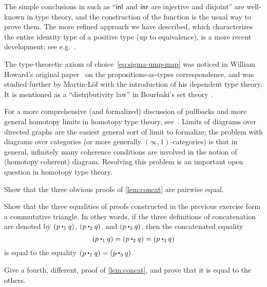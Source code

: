 The simple conclusions in  such as ``${\mathsf{inl}}$ and ${\mathsf{inr}}$ are injective and disjoint'' are well-known in type theory, and the construction of the function \encode is the usual way to prove them.
The more refined approach we have described, which characterizes the entire identity type of a positive type (up to equivalence), is a more recent development; see e.g.~\cite{ls:pi1s1}.

%
The type-theoretic axiom of choice~\eqref{eq:sigma-ump-map} was noticed in William Howard's original paper~\cite{howard:pat} on the propositions-as-types correspondence, and was studied further by Martin-L\"of with the introduction of his dependent type theory.  It is mentioned as a ``distributivity law'' in Bourbaki's set theory \cite{Bourbaki}.%

For a more comprehensive (and formalized) discussion of pullbacks and more general homotopy limits in homotopy type theory, see~\cite{AKL13}.
Limits of diagrams over directed graphs are the easiest general sort of limit to formalize; the problem with diagrams over categories (or more generally $(\infty,1)$-categories)
%
%
is that in general, infinitely many coherence conditions are involved in the notion of (homotopy coherent) diagram.
Resolving this problem is an important open question in homotopy type theory.

\sectionExercises

\begin{ex}\label{ex:basics:concat}
  Show that the three obvious proofs of \cref{lem:concat} are pairwise equal.
\end{ex}

\begin{ex}\label{ex:eq-proofs-commute}
  Show that the three equalities of proofs constructed in the previous exercise form a commutative triangle.
  In other words, if the three definitions of concatenation are denoted by $(p \mathbin{\ct_1} q)$, $(p\mathbin{\ct_2} q)$, and $(p\mathbin{\ct_3} q)$, then the concatenated equality
  \[(p\mathbin{\ct_1} q) = (p\mathbin{\ct_2} q) = (p\mathbin{\ct_3} q)\]
  is equal to the equality $(p\mathbin{\ct_1} q) = (p\mathbin{\ct_3} q)$.
\end{ex}

\begin{ex}\label{ex:fourth-concat}
  Give a fourth, different, proof of \cref{lem:concat}, and prove that it is equal to the others.
\end{ex}

